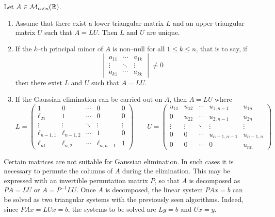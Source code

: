 \begin{theorem}
	Let $A \in \mathcal{M}_{n \times n}(\mathbb{R})$.
	\begin{enumerate}[label={(\arabic*)}, topsep=0pt]
		\item Assume that there exist a lower triangular matrix $L$ and an
		upper triangular matrix $U$ such that $A = L U$. Then $L$ and $U$ are
		unique.
        \item If the $k$--th principal minor of $A$ is non--null for all $1 \leq
        k \leq n$, that is to say, if
        \begin{equation*}
            \begin{vmatrix}
                a_{11} & \cdots & a_{1k} \\
                \vdots & \ddots & \vdots \\
                a_{k1} & \cdots & a_{kk}
            \end{vmatrix} \neq 0
        \end{equation*}
        then there exist $L$ and $U$ such that $A = L U$.
        \item If the Gaussian elimination can be carried out on $A$, then $A = L U$ where
        \begin{equation*}
			L = 
			\begin{pmatrix}
				1 				& 0 			& \cdots & 0 				& 0  \\
				\ell_{21} 		& 1 			& \cdots & 0 				& 0 \\
				\vdots 			& \vdots 		& \ddots & \vdots 	  		& \vdots \\
				\ell_{n-1,1} 	& \ell_{n-1,2} 	& \cdots & 1 				& 0 \\
				\ell_{n1} 		& \ell_{n,2} 	& \cdots & \ell_{n,n-1} 	& 1
			\end{pmatrix}
			\qquad			
			U = 
			\begin{pmatrix}
				u_{11} 	& u_{12} & \cdots & u_{1,n-1} & u_{1n} \\
				0		& u_{22} & \cdots & u_{2,n-1} & u_{2n} \\
				\vdots	& \vdots & \ddots & \vdots 	  & \vdots \\
				0 		& 0		 & \cdots & u_{n-1,n-1} & u_{n-1,n} \\
				0 	   	& 0		 & \cdots & 0 			& u_{nn}
			\end{pmatrix}	
		\end{equation*}
	\end{enumerate}
\end{theorem}

Certain matrices are not suitable for Gaussian elimination. In such cases it is
necessary to permute the columns of $A$ during the elimination. This may be
expressed with an invertible permutation matrix $P$, so that $A$ is decomposed
as $P A = L U$ or $A = P^{-1} L U$. Once $A$ is decomposed, the linear system $P
A x = b$ can be solved as two triangular systems with the previously seen
algorithms. Indeed, since $P A x = L U x = b$, the systems to be solved are $L y
= b$ and $U x = y$. 
